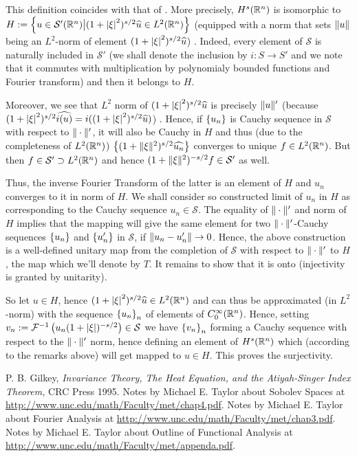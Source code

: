 \documentclass[10pt]{article} %
\renewcommand{\S}{\mathcal{S}}
\def \hat {\widehat}
\begin{document}
\begin{myremark}This definition coincides with that of \cite{met-sobolev}. More precisely, $H^s(\mathbb{R}^n)$ is
isomorphic to 
$H:=\left\{u\in\mathcal{S}'(\mathbb{R}^n)\big| (1+\left|\xi\right|^2)^{s/2}\widehat{u}\in L^2(\mathbb{R}^n)\right\}$ (equipped with
a norm that sets $\| u \|$ being an $L^2$-norm of element $(1+\left|\xi\right|^2)^{s/2}\widehat{u}$)
. Indeed, every element of $\S$ is naturally included in $\S'$ (we shall denote the inclusion by $i:S\rightarrow S'$
and we note that it commutes with multiplication by polynomialy bounded functions and Fourier transform) 
and then it belongs to $H$.

Moreover, we see that $L^2$ norm of $(1+\myabs{ \xi }^2)^{ s/2 }\hat{ u }$ is precisely
$\| u \|'$ (because $(1+\myabs{ \xi }^2)^{ s/2 }\hat{i(u)}=i((1+\myabs{ \xi }^2)^{ s/2 }\hat{ u })$)
. Hence, if $\left\{ u_n \right\}$ is Cauchy sequence in $\S$ with respect to $\| \cdot \|'$, it will
also be Cauchy in $H$ and thus (due to the completeness of $L^2(\mathbb{R}^n)$)
$\mycbra{ (1+\mynorm{ \xi }^2)^{ s/2 }\hat{ u_n } }$ converges to unique
$f\in L^2(\mathbb{R}^n)$. But then $f\in\S'\supset L^2(\R^n)$ and hence $(1+\mynorm{ \xi }^2)^{ -s/2 }f\in\S'$ as well. \par
Thus, the inverse Fourier Transform of the latter is an element of $H$ and $u_n$ converges to it in norm of $H$.
We shall consider so constructed limit of $u_n$ in $H$ as corresponding to the Cauchy sequence $u_n\in\S$.
The equality of $\| \cdot \|'$ and norm of $H$
implies that the mapping will give the same element for two $\| \cdot \|'$-Cauchy
sequences $\left\{ u_n \right\}$ and $\left\{ u_n' \right\}$ in $\S$, if $\| u_n-u_n' \|\to0$. Hence, the above construction is
a well-defined unitary map from the completion of $\S$ with respect to $\| \cdot \|'$ to $H$, the map which we'll
denote by $T$. It remains to show that it is onto (injectivity is granted by unitarity).\par
So let $u\in H$, hence $(1+\myabs{ \xi }^2)^{ s/2 }\hat{ u }\in L^2(\R^n)$ and can thus be approximated (in $L^2$-norm) with
the sequence $\left\{ u_n \right\}_n$ of elements of $C_0^{ \infty }(\mathbb{R}^n)$. Hence, setting $v_n:=\mathcal{ F }^{ -1 }\left( u_n(1+
\left| \xi \right|)^{ -s/2 } \right)\in\mathcal{ S }$ we have $\left\{ v_n \right\}_n$ forming a Cauchy sequence with respect to the $\| \cdot \|'
$ norm, hence defining an element of $H^s(\mathbb{R}^n)$ which (according to the remarks above) will get mapped to $u\in H$. This proves
the surjectivity.
\end{myremark}
\begin{thebibliography}{9}
	P. B. Gilkey, {\it Invariance Theory, The Heat Equation, and the Atiyah-Singer Index Theorem,} CRC Press 1995.
	Notes by Michael E. Taylor about Sobolev Spaces at \url{http://www.unc.edu/math/Faculty/met/chap4.pdf}.
	Notes by Michael E. Taylor about Fourier Analysis at \url{http://www.unc.edu/math/Faculty/met/chap3.pdf}.
	Notes by Michael E. Taylor about Outline of Functional Analysis
		at \url{http://www.unc.edu/math/Faculty/met/appenda.pdf}.
\end{thebibliography}
\end{document}
